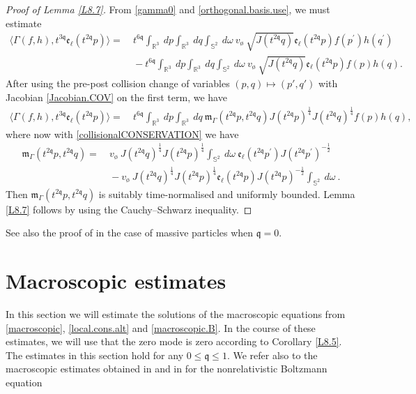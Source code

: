 \documentclass[reqno]{amsart}
\newcommand{\pv}{p}
\newcommand{\qv}{q}
\newcommand{\qq}{\mathfrak{q}}
\newcommand{\tqq}{t^{2\qq}}
\newcommand{\tTq}{t^{3\qq}}
\newcommand{\tQQq}{t^{6\qq}}
\newcommand{\Emptyset}{\text{\o}}
\theoremstyle{definition}
\numberwithin{equation}{section}
\numberwithin{theorem}{section}
\begin{document}
\begin{proof}[Proof of Lemma \ref{L8.7}]	
From \eqref{gamma0} and \eqref{orthogonal.basis.use},  we must estimate 
\begin{align*}
    	\langle   \Gamma(f,h),\tTq \mathfrak{e}_{\ell}(\tqq \pv)\rangle
        = &~
\tQQq\int_{\mathbb{R}^3} ~  d\pv \int_{\mathbb{R}^3} ~  dq 
\int_{\mathbb{S}^{2}} ~ d\omega
~ v_{\Emptyset} ~  
 \sqrt{J(\tqq\qv)}\mathfrak{e}_{\ell}(\tqq \pv)
 f(p^{\prime })h(q^{\prime})
        \\
        &~
-\tQQq\int_{\mathbb{R}^3} ~  d\pv\int_{\mathbb{R}^3} ~  dq 
\int_{\mathbb{S}^{2}} ~ d\omega
~ v_{\Emptyset} ~  
 \sqrt{J(\tqq\qv)}\mathfrak{e}_{\ell}(\tqq \pv)
 f(p)h(q).
\end{align*}
After using the pre-post collision change of variables \((p,q)\mapsto (p',q')\) with Jacobian \eqref{Jacobian.COV} on the first term, we have
\begin{align*}
    	\langle   \Gamma(f,h),\tTq \mathfrak{e}_{\ell}(\tqq \pv)\rangle
        = &~
\tQQq\int_{\mathbb{R}^3} ~  d\pv\int_{\mathbb{R}^3} ~  dq ~
\mathfrak{m}_{\Gamma}(\tqq\pv,\tqq\qv)
J(\tqq\pv)^{\frac14}J(\tqq\qv)^{\frac14} 
 f(p)h(q),
\end{align*}
where now with \eqref{collisionalCONSERVATION} we have
\begin{align*}
\mathfrak{m}_{\Gamma}(\tqq\pv,\tqq\qv)
= &~
v_{\Emptyset}~J(\tqq\qv)^{\frac14} J(\tqq\pv)^{\frac14} \int_{\mathbb{S}^{2}} ~ d\omega~  
\mathfrak{e}_{\ell}(\tqq \pv^{\prime}) J(\tqq \pv^{\prime})^{-\frac12}
\\
 &~
-
v_{\Emptyset}~J(\tqq\qv)^{\frac14} J(\tqq\pv)^{\frac14} \mathfrak{e}_{\ell}(\tqq \pv) J(\tqq \pv)^{-\frac12}\int_{\mathbb{S}^{2}} ~ d\omega~  
.
\end{align*}
Then $\mathfrak{m}_{\Gamma}(\tqq\pv,\tqq\qv)$ is suitably time-normalised and uniformly bounded. Lemma \ref{L8.7} follows by using the Cauchy--Schwarz inequality.
\end{proof}
See also the proof of \cite[Lemma 6.7]{RelBolNoncut2020} in the case of massive particles when \(\qq=0\).






\section{Macroscopic estimates}\label{macroscopic.eqns.sec}

In this section we will estimate the solutions of the macroscopic equations from \eqref{macroscopic}, \eqref{local.cons.alt} and \eqref{macroscopic.B}.  In the course of these estimates, we will use that the zero mode is zero according to Corollary \ref{L8.5}. The estimates in this section hold for any $0 \leq \qq \leq 1$. We refer also to the macroscopic estimates obtained in \cite{EGKM-13} and in \cite[Section 5.1]{1904.12086} for the nonrelativistic Boltzmann equation  
\end{document}
